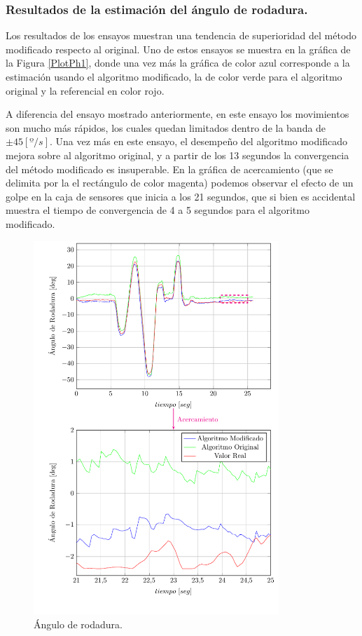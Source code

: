 \documentclass[conference]{IEEEtran}
\begin{document}
\subsubsection{Resultados de la estimación del ángulo de rodadura.}
Los resultados de los ensayos muestran una tendencia de superioridad del método modificado respecto al original. Uno de estos ensayos se muestra en la gráfica de la Figura \ref{PlotPh1}, donde una vez más la gráfica de color azul corresponde a la estimación usando el algoritmo modificado, la de color verde para el algoritmo original y la referencial en color rojo. \par
A diferencia del ensayo mostrado anteriormente, en este ensayo los movimientos son mucho más rápidos, los cuales quedan limitados dentro de la banda de $\pm45[º/s]$. Una vez más en este ensayo, el desempeño del algoritmo modificado mejora sobre al algoritmo original, y a partir de los 13 segundos la convergencia del método modificado es insuperable. En la gráfica de acercamiento (que se delimita por la el rectángulo de color magenta) podemos observar el efecto de un golpe en la caja de sensores que inicia a los 21 segundos, que si bien es accidental muestra el tiempo de convergencia de 4 a 5 segundos para el algoritmo modificado.\par
\begin{figure}
\begin{center}
\includegraphics[width=25em]
{PlotTh27.pdf}
\caption{Ángulo de rodadura.}
\label{PlotTh1}
\end{center}
\end{figure}
\end{document}
